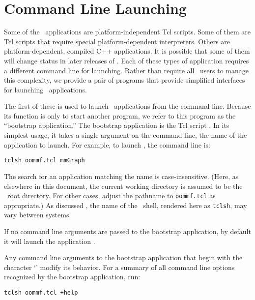 
\section{Command Line Launching}\label{sec:cll}

Some of the \OOMMF\ applications are platform-independent Tcl
scripts.  Some of them are Tcl scripts that require special
platform-dependent interpreters.  Others are platform-dependent,
compiled C++ applications.  It is possible that some of them will 
change status in later releases of \OOMMF.  Each of these types
of application requires a different command line for launching.
Rather than require all \OOMMF\ users to manage this complexity,
we provide a pair of programs that provide simplified interfaces
for launching \OOMMF\ applications.

The first of these is used to launch \OOMMF\ applications from the
command line.  Because its function is only to start another
program, we refer to this program as the ``bootstrap application.''
The bootstrap application is the Tcl script .
In its simplest usage, it takes a single argument on the command line,
the name of the application to launch.  For example, to launch
,
the command line is:
\begin{verbatim}
tclsh oommf.tcl mmGraph
\end{verbatim}
The search for an application matching the name is case-insensitive.
(Here, as elsewhere in this document, the current working
directory is assumed to be the \OOMMF\ root
directory.  For other cases, adjust the pathname to {\tt oommf.tcl} as
appropriate.)  As discussed , the name of the \Tcl\ shell,
rendered here as \verb+tclsh+, may vary between systems.

If no command line arguments are passed to the bootstrap application,
by default it will launch the application
.

Any command line arguments to the bootstrap
application that begin with the character `\cd{+}' modify its
behavior.
For a summary of all command line options recognized by the bootstrap
application, run:
\begin{verbatim}
tclsh oommf.tcl +help
\end{verbatim}

